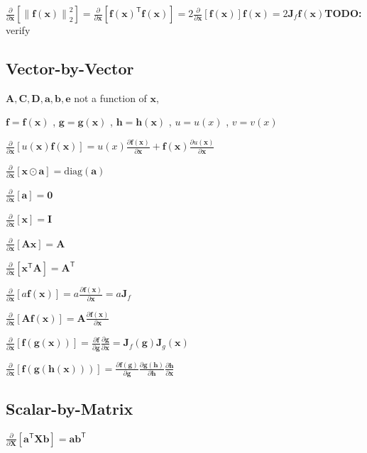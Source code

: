 \documentclass[a2paper,8pt]{extarticle}
\newcommand{\norm}[1]{\left\lVert #1 \right\rVert}
\newcommand*{\T}{\mathsf{T}}
\newcommand{\diag}{\text{diag}}
\newcommand{\mat}[1]{\mathbf{#1}}
\renewcommand{\vec}[1]{\mathbf{#1}}
\newcommand{\va}{\vec{a}}
\newcommand{\vb}{\vec{b}}
\newcommand{\ve}{\vec{e}}
\newcommand{\vf}{\vec{f}}
\newcommand{\vg}{\vec{g}}
\newcommand{\vh}{\vec{h}}
\newcommand{\vx}{\vec{x}}
\newcommand{\MA}{\mat{A}}
\newcommand{\MC}{\mat{C}}
\newcommand{\MD}{\mat{D}}
\newcommand{\MI}{\mat{I}}
\newcommand{\MJ}{\mat{J}}
\newcommand{\MO}{\mat{0}}
\newcommand{\MX}{\mat{X}}
\newcommand{\todo}[1]{\textbf{TODO:} #1}
\newcommand{\todo}[1]{%
}
\begin{document}
\begin{landscape}
\begin{multicols*}{7}
$
\frac{\partial}{\partial \vx}\left[\norm{\vf(\vx)}_2^2\right]
=
\frac{\partial}{\partial \vx}\left[\vf(\vx)^\T\vf(\vx)\right]
=
2\frac{\partial }{\partial\vx}\left[\vf(\vx)\right]\vf(\vx)
=
2\MJ_f\vf(\vx)
$\todo{verify}

\subsection{Vector-by-Vector}

$\MA,\MC,\MD,\va,\vb,\ve$ not a function of $\vx$,

$\vf=\vf(\vx)$
, $\vg=\vg(\vx)$
, $\vh=\vh(\vx)$
, $u=u(x)$
, $v=v(x)$

$
\frac{\partial}{\partial \vx}
\left[
u(\vx)\vf(\vx)
\right] 
= 
u(x)
\frac{\partial \vf(\vx)}{\partial\vx}
+
\vf(\vx)
\frac{\partial u(\vx)}{\partial\vx}
$

\begin{multicols*}{2}
$\frac{\partial }{\partial\vx}\left[\vx\odot\va\right]=\diag(\va)$

$
\frac{\partial}{\partial \vx}
\left[\va\right] 
=
\MO
$

$
\frac{\partial}{\partial \vx}
\left[\vx\right] 
=
\MI
$

$
\frac{\partial}{\partial \vx}
\left[\MA\vx\right] 
= 
\MA
$

$
\frac{\partial}{\partial \vx}
\left[\vx^\T\MA\right] 
= 
\MA^\T
$

$
\frac{\partial}{\partial \vx}
\left[
a\vf(\vx)
\right] 
= 
a
\frac{\partial \vf(\vx)}{\partial\vx}
=
a\MJ_f
$

$
\frac{\partial}{\partial \vx}
\left[
\MA\vf(\vx)
\right] 
= 
\MA\frac{\partial \vf(\vx)}{\partial \vx}
$

$
\frac{\partial}{\partial \vx}
\left[
\vf(\vg(\vx))
\right] 
= 
\frac{\partial \vf}{\partial \vg}
\frac{\partial \vg}{\partial \vx}
=
\MJ_f(\vg)\MJ_g(\vx)
$

$
\frac{\partial}{\partial \vx}
\left[
\vf(\vg(\vh(\vx)))
\right] 
= 
\frac{\partial \vf(\vg)}{\partial \vg}
\frac{\partial \vg(\vh)}{\partial \vh}
\frac{\partial \vh}{\partial \vx}
$
\end{multicols*}

\subsection{Scalar-by-Matrix}

\begin{multicols}{2}
$
\frac{\partial}{\partial \MX}
\left[
\va^\T\MX\vb
\right]
=\va\vb^\T
$


\end{multicols}
\end{multicols*}
\end{landscape}
\end{document}
